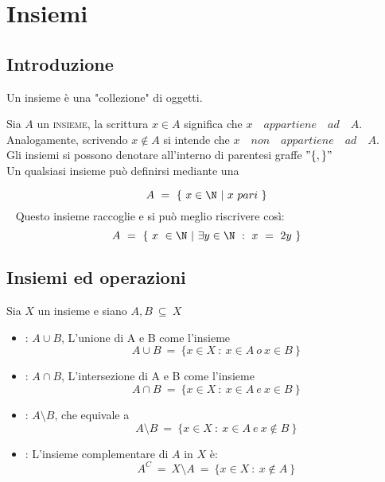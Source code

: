 \documentclass[../analisi.tex]{subfiles}
\begin{document}
\section{Insiemi}
\subsection{Introduzione}

\begin{defn}
	Un insieme è una "collezione" di oggetti.
\end{defn}
Sia $A$ un \textsc{insieme}, la scrittura $ x \in A $ significa che $x \quad
appartiene \quad ad \quad A$.\\
Analogamente, scrivendo $ x \notin A $ si intende che $ x \quad non \quad appartiene \quad ad \quad A$.\\
Gli insiemi  si possono denotare all'interno di parentesi graffe $ " \{ , \} " $\\
Un qualsiasi insieme può definirsi mediante una 

\begin{esem}
	\begin{equation}
	A\ =\ \{\ x \in \N\ |\ x\ pari\ \}
	\end{equation} 
	Questo insieme raccoglie  e si può meglio riscrivere così:
	\begin{equation}
	A\ =\ \{\ x\ \in \N\ |\ \exists y \in \N\ :\ x\ =\ 2y\ \}
	\end{equation}
\end{esem}

\subsection{Insiemi ed operazioni}
Sia $X$ un insieme e siano $A,B\ \subseteq\ X$
\begin{itemize}
	\item {}: $A \cup B$, L'unione di A e B come l'insieme 
		\begin{equation}
			A \cup B\ =\ \{ x \in X\ :\ x\in A\ o\ x\in B\ \}
		\end{equation}
	\item {}: $A \cap B$, L'intersezione di A e B come l'insieme
		\begin{equation}
			A \cap B\ =\ \{ x \in X\ :\ x\in A\ e\ x\in B\ \}
		\end{equation}
	\item {}: $A \setminus B$, che equivale a
		\begin{equation}
			A \setminus B\ =\ \{x \in X\ :\ x \in A\ e\ x \notin B\ \}
		\end{equation}
	\item {}: L'insieme complementare di $A$ in $X$ è:
		\begin{equation}
			A^C\ =\ X \setminus A\ =\ \{x \in X\ :\ x \notin A\ \}
		\end{equation}
\end{itemize}
\end{document}
